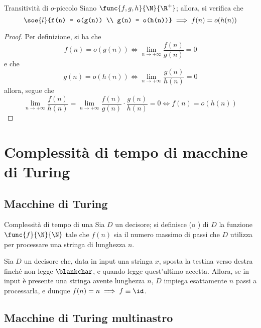 \documentclass[a4paper, 12pt]{report}
\begin{document}
    \begin{framedprop}[label={o trans}]{Transitività di $o$-piccolo}
        Siano $\func{f, g, h}{\N}{\R^+}$; allora, si verifica che $$\soe{l}{f(n) = o(g(n)) \\ g(n) = o(h(n))} \implies f(n) = o(h(n))$$
    \end{framedprop}

    \begin{proof}
        Per definizione, si ha che $$f(n) = o(g(n)) \iff \displaystyle \lim_{n \to + \infty}{\dfrac{f(n)}{g(n)} = 0}$$ e che $$g(n) = o(h(n)) \iff \displaystyle \lim_{n \to + \infty}{\dfrac{g(n)}{h(n)}} = 0$$ allora, segue che $$\lim_{n \to + \infty}{\dfrac{f(n)}{h(n)}} = \lim_{n \to + \infty}{\dfrac{f(n)}{g(n)} \cdot \dfrac{g(n)}{h(n)}} = 0 \iff f(n) = o(h(n))$$
    \end{proof}

    \section{Complessità di tempo di macchine di Turing}

    \subsection{Macchine di Turing}

    \begin{frameddefn}{Complessità di tempo di una \TM}
        Sia $D$ un decisore; si definisce  (o ) di $D$ la funzione $\func{f}{\N}{\N}$ tale che $f(n)$ sia il numero massimo di passi che $D$ utilizza per processare una stringa di lunghezza $n$.
    \end{frameddefn}

    \begin{example}
        Sia $D$ un decisore che, data in input una stringa $x$, sposta la testina verso destra finché non legge $\blankchar$, e quando legge quest'ultimo accetta. Allora, se in input è presente una stringa avente lunghezza $n$, $D$ impiega esattamente $n$ passi a processarla, e dunque $f(n) = n \implies f \equiv \id$.
    \end{example}

    \subsection{Macchine di Turing multinastro}
\end{document}
